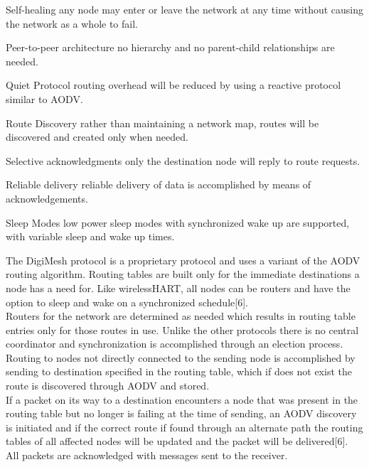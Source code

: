 \documentclass[journal,compsoc]{IEEEtran}
\begin{document}
\begin{LaTeXdescription}
  \item[Self-healing] any node may enter or leave the network at any time without causing the network as a whole to fail.\\
  \item[Peer-to-peer architecture] no hierarchy and no parent-child relationships are needed.\\
  \item[Quiet Protocol] routing overhead will be reduced by using a reactive protocol similar to AODV.\\
  \item[Route Discovery] rather than maintaining a network map, routes will be discovered and created only when needed.\\
  \item[Selective acknowledgments] only the destination node will reply to route requests.\\
  \item[Reliable delivery] reliable delivery of data is accomplished by means of acknowledgements.\\
  \item[Sleep Modes] low power sleep modes with synchronized wake up are supported, with variable sleep and wake up times.\\
\end{LaTeXdescription}

\noindent The DigiMesh protocol is a proprietary protocol and uses a variant of the AODV routing algorithm. Routing tables are built only for the immediate destinations a node has a need for.  Like wirelessHART, all nodes can be routers and have the option to sleep and wake on a synchronized schedule[6].\\

\noindent Routers for the network are determined as needed which results in routing table entries only for those routes in use. Unlike the other protocols there is no central coordinator and synchronization is accomplished through an election process.  Routing to nodes not directly connected to the sending node is accomplished by sending to destination specified in the routing table, which if does not exist the route is discovered through AODV and stored.\\

\noindent If a packet on its way to a destination encounters a node that was present in the routing table but no longer is failing at the time of sending, an AODV discovery is initiated and if the correct route if found through an alternate path the routing tables of all affected nodes will be updated and the packet will be delivered[6].  All packets are acknowledged with messages sent to the receiver.\\
\end{document}
